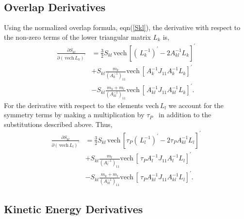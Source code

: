 \documentclass[12pt]{article}
\begin{document}
\subsection{Overlap Derivatives}

Using the normalized overlap formula, eqn(\ref{Skl}), the derivative with
respect to the non-zero terms of the lower triangular matrix $L_{k}$ is,
\begin{align}
\frac{\partial S_{kl}}{\partial\left(  \,\mathrm{vech}\,L_{k}\right)
^{\prime}}  &  =\frac{3}{2}S_{kl}\,\mathrm{vech}\,\left[  \left(  \,L_{k}%
^{-1}\right)  ^{\prime}-2A_{kl}^{-1}L_{k}\right]  ^{\prime}\nonumber\\
&  +S_{kl}\frac{m_{k}}{\left(  A_{k}^{-1}\right)  _{11}}\mathrm{vech}\,\left[
\,A_{k}^{-1}J_{11}A_{k}^{-1}L_{k}\right]  ^{\prime}\nonumber\\
&  -S_{kl}\frac{m_{k}+m_{l}}{\left(  A_{kl}^{-1}\right)  _{11}}\mathrm{vech}%
\,\left[  \,A_{kl}^{-1}J_{11}A_{kl}^{-1}L_{k}\right]  ^{\prime}.
\end{align}
For the derivative with respect to the elements $\mathrm{vech}\,L_{l}$ we
account for the symmetry terms by making a multiplication by $\tau_{P}$ \ in
addition to the substitutions described above. Thus,
\begin{align}
\frac{\partial S_{kl}}{\partial\left(  \,\mathrm{vech}\,L_{l}\right)
^{\prime}}  &  =\frac{3}{2}S_{kl}\,\mathrm{vech}\,\left[  \tau_{P}\left(
\,L_{l}^{-1}\right)  ^{\prime}-2\tau_{P}A_{kl}^{-1}L_{l}\right]  ^{\prime
}\nonumber\\
&  +S_{kl}\frac{m_{l}}{\left(  A_{l}^{-1}\right)  _{11}}\mathrm{vech}\,\left[
\,\tau_{P}A_{l}^{-1}J_{11}A_{l}^{-1}L_{l}\right]  ^{\prime}\nonumber\\
&  -S_{kl}\frac{m_{k}+m_{l}}{\left(  A_{kl}^{-1}\right)  _{11}}\mathrm{vech}%
\,\left[  \,\tau_{P}A_{kl}^{-1}J_{11}A_{kl}^{-1}L_{l}\right]  ^{\prime}.
\end{align}

\subsection{Kinetic Energy Derivatives}
\end{document}
